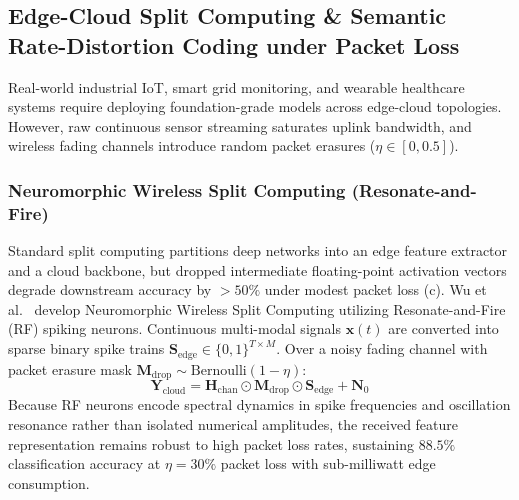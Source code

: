 \subsection{Edge-Cloud Split Computing \& Semantic Rate-Distortion Coding under Packet Loss}
\label{sec:split_computing_semantic}
Real-world industrial IoT, smart grid monitoring, and wearable healthcare systems require deploying foundation-grade models across edge-cloud topologies. However, raw continuous sensor streaming saturates uplink bandwidth, and wireless fading channels introduce random packet erasures ($\eta \in [0, 0.5]$).

\subsubsection{Neuromorphic Wireless Split Computing (Resonate-and-Fire)}
Standard split computing partitions deep networks into an edge feature extractor and a cloud backbone, but dropped intermediate floating-point activation vectors degrade downstream accuracy by $>50\%$ under modest packet loss (c). Wu et al.~\cite{Wu2025NeuromorphicSplit} develop Neuromorphic Wireless Split Computing utilizing Resonate-and-Fire (RF) spiking neurons. Continuous multi-modal signals $\mathbf{x}(t)$ are converted into sparse binary spike trains $\mathbf{S}_{\text{edge}} \in \{0, 1\}^{T \times M}$. Over a noisy fading channel with packet erasure mask $\mathbf{M}_{\text{drop}} \sim \text{Bernoulli}(1 - \eta)$:
\begin{equation}
    \mathbf{Y}_{\text{cloud}} = \mathbf{H}_{\text{chan}} \odot \mathbf{M}_{\text{drop}} \odot \mathbf{S}_{\text{edge}} + \mathbf{N}_0
\end{equation}
Because RF neurons encode spectral dynamics in spike frequencies and oscillation resonance rather than isolated numerical amplitudes, the received feature representation remains robust to high packet loss rates, sustaining $88.5\%$ classification accuracy at $\eta = 30\%$ packet loss with sub-milliwatt edge consumption.

